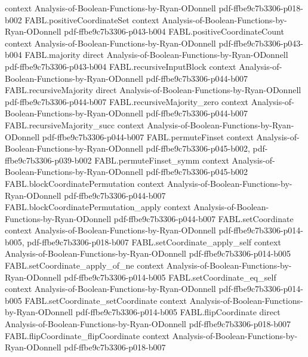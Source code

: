 \begin{theorem}
  {context}
  {Analysis-of-Boolean-Functions-by-Ryan-ODonnell}
  {pdf-ffbe9c7b3306-p018-b002}
\proofstep
  {FABL.positiveCoordinateSet}
  {context}
  {Analysis-of-Boolean-Functions-by-Ryan-ODonnell}
  {pdf-ffbe9c7b3306-p043-b004}
\proofstep
  {FABL.positiveCoordinateCount}
  {context}
  {Analysis-of-Boolean-Functions-by-Ryan-ODonnell}
  {pdf-ffbe9c7b3306-p043-b004}
\proofstep
  {FABL.majority}
  {direct}
  {Analysis-of-Boolean-Functions-by-Ryan-ODonnell}
  {pdf-ffbe9c7b3306-p043-b004}
\proofstep
  {FABL.recursiveInputBlock}
  {context}
  {Analysis-of-Boolean-Functions-by-Ryan-ODonnell}
  {pdf-ffbe9c7b3306-p044-b007}
\proofstep
  {FABL.recursiveMajority}
  {direct}
  {Analysis-of-Boolean-Functions-by-Ryan-ODonnell}
  {pdf-ffbe9c7b3306-p044-b007}
\proofstep
  {FABL.recursiveMajority_zero}
  {context}
  {Analysis-of-Boolean-Functions-by-Ryan-ODonnell}
  {pdf-ffbe9c7b3306-p044-b007}
\proofstep
  {FABL.recursiveMajority_succ}
  {context}
  {Analysis-of-Boolean-Functions-by-Ryan-ODonnell}
  {pdf-ffbe9c7b3306-p044-b007}
\proofstep
  {FABL.permuteFinset}
  {context}
  {Analysis-of-Boolean-Functions-by-Ryan-ODonnell}
  {pdf-ffbe9c7b3306-p045-b002,
    pdf-ffbe9c7b3306-p039-b002}
\proofstep
  {FABL.permuteFinset_symm}
  {context}
  {Analysis-of-Boolean-Functions-by-Ryan-ODonnell}
  {pdf-ffbe9c7b3306-p045-b002}
\proofstep
  {FABL.blockCoordinatePermutation}
  {context}
  {Analysis-of-Boolean-Functions-by-Ryan-ODonnell}
  {pdf-ffbe9c7b3306-p044-b007}
\proofstep
  {FABL.blockCoordinatePermutation_apply}
  {context}
  {Analysis-of-Boolean-Functions-by-Ryan-ODonnell}
  {pdf-ffbe9c7b3306-p044-b007}
\proofstep
  {FABL.setCoordinate}
  {context}
  {Analysis-of-Boolean-Functions-by-Ryan-ODonnell}
  {pdf-ffbe9c7b3306-p014-b005,
    pdf-ffbe9c7b3306-p018-b007}
\proofstep
  {FABL.setCoordinate_apply_self}
  {context}
  {Analysis-of-Boolean-Functions-by-Ryan-ODonnell}
  {pdf-ffbe9c7b3306-p014-b005}
\proofstep
  {FABL.setCoordinate_apply_of_ne}
  {context}
  {Analysis-of-Boolean-Functions-by-Ryan-ODonnell}
  {pdf-ffbe9c7b3306-p014-b005}
\proofstep
  {FABL.setCoordinate_eq_self}
  {context}
  {Analysis-of-Boolean-Functions-by-Ryan-ODonnell}
  {pdf-ffbe9c7b3306-p014-b005}
\proofstep
  {FABL.setCoordinate_setCoordinate}
  {context}
  {Analysis-of-Boolean-Functions-by-Ryan-ODonnell}
  {pdf-ffbe9c7b3306-p014-b005}
\proofstep
  {FABL.flipCoordinate}
  {direct}
  {Analysis-of-Boolean-Functions-by-Ryan-ODonnell}
  {pdf-ffbe9c7b3306-p018-b007}
\proofstep
  {FABL.flipCoordinate_flipCoordinate}
  {context}
  {Analysis-of-Boolean-Functions-by-Ryan-ODonnell}
  {pdf-ffbe9c7b3306-p018-b007}
\proofstep

\end{theorem}
